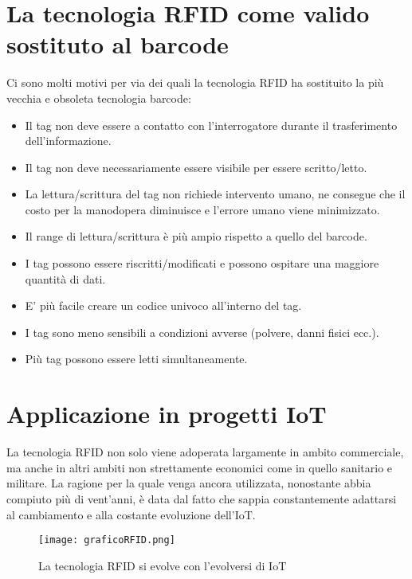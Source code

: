 \documentclass[a4paper,titlepage]{report}
\begin{document}
\section{La tecnologia RFID come valido sostituto al barcode}
Ci sono molti motivi per via dei quali la tecnologia RFID ha sostituito la più vecchia e obsoleta tecnologia barcode:
\begin{itemize}
\item Il tag non deve essere a contatto con l'interrogatore durante il trasferimento dell'informazione.
\item Il tag non deve necessariamente essere visibile per essere scritto/letto.
\item La lettura/scrittura del tag non richiede intervento umano, ne consegue che il costo per la manodopera diminuisce e l'errore umano viene minimizzato.
\item Il range di lettura/scrittura è più ampio rispetto a quello del barcode.
\item I tag possono essere riscritti/modificati e possono ospitare una maggiore quantità di dati.
\item E' più facile creare un codice univoco all'interno del tag.
\item I tag sono meno sensibili a condizioni avverse (polvere, danni fisici ecc.).
\item Più tag possono essere letti simultaneamente\cite{Kaur:RFIDTechnologyPrinciplesAdvantagesLimitationsApplications}.
\end{itemize}
\section{Applicazione in progetti IoT}
La tecnologia RFID non solo viene adoperata largamente in ambito commerciale, ma anche in altri ambiti non strettamente economici come in quello sanitario e militare. La ragione per la quale venga ancora utilizzata, nonostante abbia compiuto più di vent'anni, è data dal fatto che sappia constantemente adattarsi al cambiamento e alla costante evoluzione dell'IoT\cite{Xiaolin:RFIDTechnologyApplicationsIoT}.\\
\begin{figure}[h]
\centering
\texttt{[image: graficoRFID.png]}
\caption{La tecnologia RFID si evolve con l'evolversi di IoT}
\end{figure}
\end{document}
